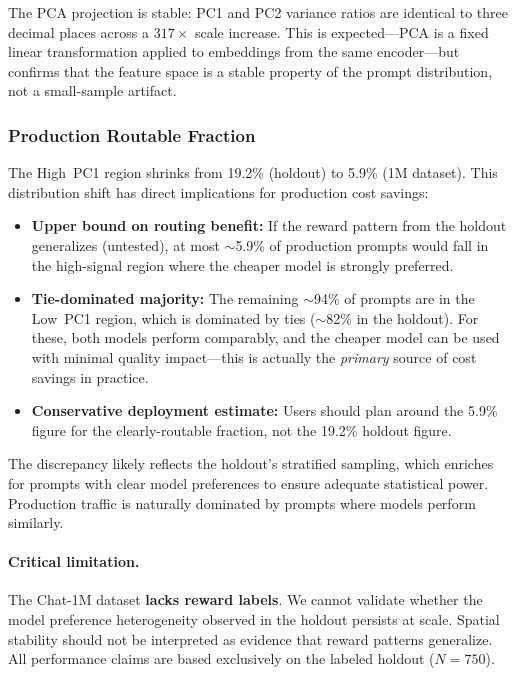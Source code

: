 The PCA projection is stable: PC1 and PC2 variance ratios are identical to three decimal places across a $317\times$ scale increase.
This is expected---PCA is a fixed linear transformation applied to embeddings from the same encoder---but confirms that the feature space is a stable property of the prompt distribution, not a small-sample artifact.

\subsubsection{Production Routable Fraction}

The High~PC1 region shrinks from 19.2\% (holdout) to 5.9\% (1M dataset).
This distribution shift has direct implications for production cost savings:

\begin{itemize}[leftmargin=*,noitemsep,topsep=0pt]
    \item \textbf{Upper bound on routing benefit:} If the reward pattern from the holdout generalizes (untested), at most $\sim$5.9\% of production prompts would fall in the high-signal region where the cheaper model is strongly preferred.
    \item \textbf{Tie-dominated majority:} The remaining $\sim$94\% of prompts are in the Low~PC1 region, which is dominated by ties ($\sim$82\% in the holdout). For these, both models perform comparably, and the cheaper model can be used with minimal quality impact---this is actually the \emph{primary} source of cost savings in practice.
    \item \textbf{Conservative deployment estimate:} Users should plan around the 5.9\% figure for the clearly-routable fraction, not the 19.2\% holdout figure.
\end{itemize}

The discrepancy likely reflects the holdout's stratified sampling, which enriches for prompts with clear model preferences to ensure adequate statistical power.
Production traffic is naturally dominated by prompts where models perform similarly.

\paragraph{Critical limitation.}
The Chat-1M dataset \textbf{lacks reward labels}.
We cannot validate whether the model preference heterogeneity observed in the holdout persists at scale.
Spatial stability should not be interpreted as evidence that reward patterns generalize.
All performance claims are based exclusively on the labeled holdout ($N=750$).

